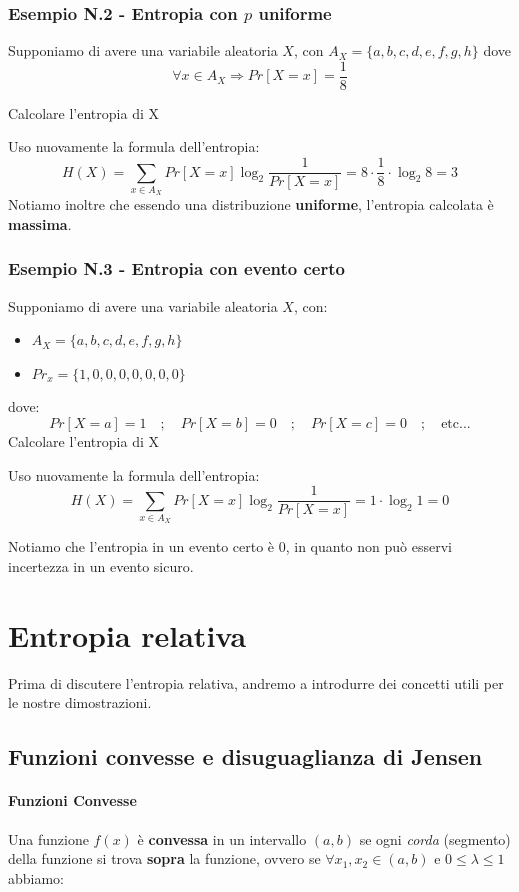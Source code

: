 \subsubsection{Esempio N.2 - Entropia con $p$ uniforme}
Supponiamo di avere una variabile aleatoria $X$, con $A_X = \{a,b,c,d,e,f,g,h\}$ dove $$\forall x \in A_X \Rightarrow Pr[X = x] = \frac{1}{8}$$

Calcolare l'entropia di X

Uso nuovamente la formula dell'entropia:
$$
H(X) = \sum_{x\in A_X} Pr[X = x] \log_{2} \frac{1}{Pr[X = x]} =
8 \cdot \frac{1}{8} \cdot \log_{2}8 = 3
$$
Notiamo inoltre che essendo una distribuzione \textbf{uniforme}, l'entropia calcolata è \textbf{massima}.

\subsubsection{Esempio N.3 - Entropia con evento certo}
Supponiamo di avere una variabile aleatoria $X$, con:
\begin{itemize}
	\item $A_X = \{a,b,c,d,e,f,g,h\}$
	\item $Pr_x = \{1,0,0,0,0,0,0,0\}$
\end{itemize}
dove:
$$
Pr[X=a] = 1\quad;\quad Pr[X=b] = 0\quad;\quad Pr[X=c] = 0 \quad; \quad \text{etc...}
$$
Calcolare l'entropia di X

Uso nuovamente la formula dell'entropia:
$$
H(X) = \sum_{x\in A_X} Pr[X = x] \log_{2} \frac{1}{Pr[X = x]} =
1 \cdot \log_{2}1 = 0
$$

Notiamo che l'entropia in un evento certo è 0, in quanto non può esservi incertezza in un evento sicuro.
\newpage

\section{Entropia relativa}
Prima di discutere l'entropia relativa, andremo a introdurre dei concetti utili per le nostre dimostrazioni.


\subsection{Funzioni convesse e disuguaglianza di Jensen}

\paragraph{Funzioni Convesse}
Una funzione $f(x)$ è \textbf{convessa} in un intervallo $(a,b)$ se ogni \textit{corda} (segmento) della funzione si trova \textbf{sopra} la funzione, ovvero se $\forall x_1, x_2 \in (a,b)$ e $0 \leq \lambda \leq 1$ abbiamo:

